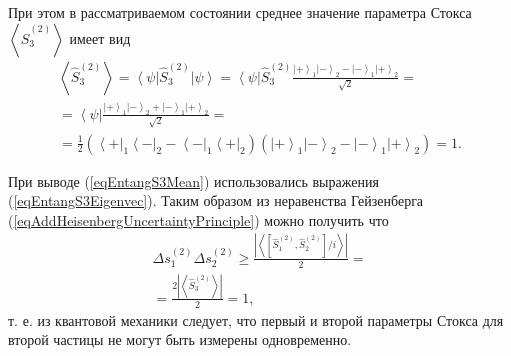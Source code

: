 При этом в рассматриваемом состоянии среднее значение параметра Стокса
$\left<\hat{S}_3^{(2)}\right>$ имеет вид
\begin{eqnarray}
  \left<\hat{S}_3^{(2)}\right> =
  \left<\psi\right|\hat{S}_3^{(2)}\left|\psi\right> =
  \left<\psi\right|\hat{S}_3^{(2)}\frac{
    \left| + \right>_1\left| - \right>_2 -
    \left| - \right>_1\left| + \right>_2
  }{\sqrt{2}} =
  \nonumber \\
  = \left<\psi\right|\frac{
    \left| + \right>_1\left| - \right>_2 +
    \left| - \right>_1\left| + \right>_2
  }{\sqrt{2}} =
  \nonumber \\
  = \frac{1}{2} \left(
  \left< + \right|_1\left< - \right|_2 -
  \left< - \right|_1\left< + \right|_2
  \right)
  \left(
  \left| + \right>_1\left| - \right>_2 -
  \left| - \right>_1\left| + \right>_2
  \right) = 1.
  \label{eqEntangS3Mean}
\end{eqnarray}

При выводе (\ref{eqEntangS3Mean}) использовались выражения
(\ref{eqEntangS3Eigenvec}). Таким образом из неравенства Гейзенберга
(\ref{eqAddHeisenbergUncertaintyPrinciple}) можно получить что
\begin{eqnarray}
  \Delta s_1^{(2)} \Delta s_2^{(2)} \ge
  \frac{\left|\left<\left[\hat{S}_1^{(2)},
      \hat{S}_2^{(2)}\right]/i\right>\right|}{2} =
  \nonumber \\
  = \frac{2 \left|\left< \hat{S}_3^{(2)} \right> \right|}{2} = 1,
  \nonumber
\end{eqnarray}
т. е. из квантовой механики следует, что первый и второй параметры
Стокса для второй частицы не могут быть измерены одновременно. 


